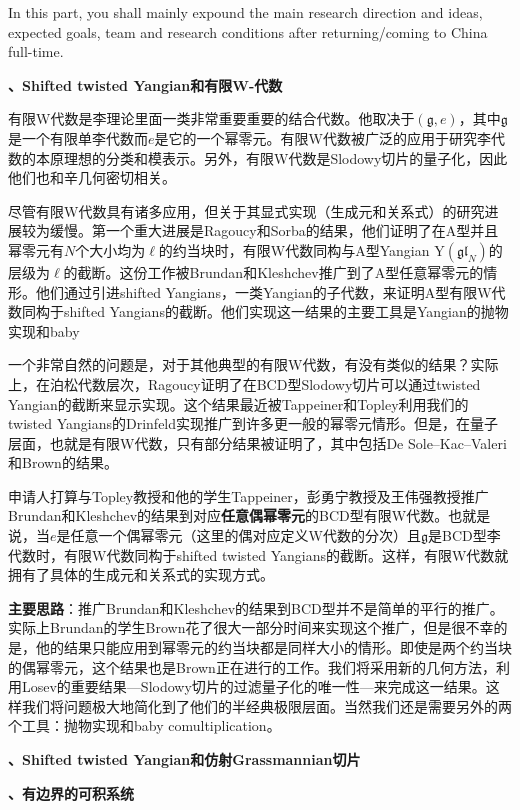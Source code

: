 \documentclass[12pt,UTF8,AutoFakeBold=2,a4paper]{ctexart}
\begin{document}
{\color{MsBlue}  
In this part, you shall mainly expound the main research direction and ideas, 
expected goals, team and research conditions after returning/coming to China 
full-time.}

\textbf{、Shifted twisted Yangian和有限W-代数}

有限W代数是李理论里面一类非常重要重要的结合代数。他取决于$(\mathfrak g,e)$，其中$\mathfrak g$是一个有限单李代数而$e$是它的一个幂零元。有限W代数被广泛的应用于研究李代数的本原理想的分类和模表示。另外，有限W代数是Slodowy切片的量子化，因此他们也和辛几何密切相关。

尽管有限W代数具有诸多应用，但关于其显式实现（生成元和关系式）的研究进展较为缓慢。第一个重大进展是Ragoucy和Sorba的结果，他们证明了在A型并且幂零元有$N$个大小均为$\ell$的约当块时，有限W代数同构与A型Yangian $\mathrm{Y}(\mathfrak{gl}_N)$的层级为$\ell$的截断。这份工作被Brundan和Kleshchev推广到了A型任意幂零元的情形。他们通过引进shifted Yangians，一类Yangian的子代数，来证明A型有限W代数同构于shifted Yangians的截断。他们实现这一结果的主要工具是Yangian的抛物实现和baby 

一个非常自然的问题是，对于其他典型的有限W代数，有没有类似的结果？实际上，在泊松代数层次，Ragoucy证明了在BCD型Slodowy切片可以通过twisted Yangian的截断来显示实现。这个结果最近被Tappeiner和Topley利用我们的twisted Yangians的Drinfeld实现推广到许多更一般的幂零元情形。但是，在量子层面，也就是有限W代数，只有部分结果被证明了，其中包括De Sole–Kac–Valeri和Brown的结果。

申请人打算与Topley教授和他的学生Tappeiner，彭勇宁教授及王伟强教授推广Brundan和Kleshchev的结果到对应\textbf{任意偶幂零元}的BCD型有限W代数。也就是说，当$e$是任意一个偶幂零元（这里的偶对应定义W代数的分次）且$\mathfrak g$是BCD型李代数时，有限W代数同构于shifted twisted Yangians的截断。这样，有限W代数就拥有了具体的生成元和关系式的实现方式。

\textbf{主要思路}：推广Brundan和Kleshchev的结果到BCD型并不是简单的平行的推广。实际上Brundan的学生Brown花了很大一部分时间来实现这个推广，但是很不幸的是，他的结果只能应用到幂零元的约当块都是同样大小的情形。即使是两个约当块的偶幂零元，这个结果也是Brown正在进行的工作。我们将采用新的几何方法，利用Losev的重要结果---Slodowy切片的过滤量子化的唯一性---来完成这一结果。这样我们将问题极大地简化到了他们的半经典极限层面。当然我们还是需要另外的两个工具：抛物实现和baby comultiplication。

\textbf{、Shifted twisted Yangian和仿射Grassmannian切片}

\textbf{、有边界的可积系统}
\end{document}
